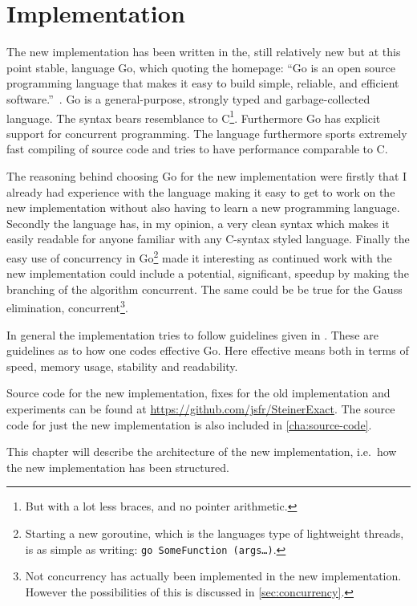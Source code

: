  {
\abnormalparskip{0pt}
\chapter{Implementation}
\label{cha:implementation}
}

The new implementation has been written in the, still relatively new but at this
point stable, language Go, which quoting the homepage: ``Go is an open source
programming language that makes it easy to build simple, reliable, and efficient
software.''~\cite{golanghomepage}. Go is a general-purpose, strongly typed and
garbage-collected language. The syntax bears resemblance to C\footnote{But
  with a lot less braces, and no pointer arithmetic.}. Furthermore Go has
explicit support for concurrent programming. The language furthermore sports
extremely fast compiling of source code and tries to have performance
comparable to C.

The reasoning behind choosing Go for the new implementation were firstly that I
already had experience with the language making it easy to get to work on the
new implementation without also having to learn a new programming
language. Secondly the language has, in my opinion, a very clean syntax which
makes it easily readable for anyone familiar with any C-syntax styled
language. Finally the easy use of concurrency in Go\footnote{Starting a new
  goroutine, which is the languages type of lightweight threads, is as simple as
  writing: \texttt{go~SomeFunction~(args\ldots)}.} made it interesting as
continued work with the new implementation could include a potential,
significant, speedup by making the branching of the algorithm concurrent. The
same could be be true for the Gauss elimination, concurrent\footnote{Not
  concurrency has actually been implemented in the new implementation. However
  the possibilities of this is discussed in \cref{sec:concurrency}.}.

In general the implementation tries to follow guidelines given in
\textcite{effectivego}. These are guidelines as to how one codes effective
Go. Here effective means both in terms of speed, memory usage, stability and
readability.

Source code for the new implementation, fixes for the old implementation and
experiments can be found at \url{https://github.com/jsfr/SteinerExact}. The
source code for just the new implementation is also included in
\cref{cha:source-code}.

This chapter will describe the architecture of the new implementation, i.e.\ how
the new implementation has been structured.

